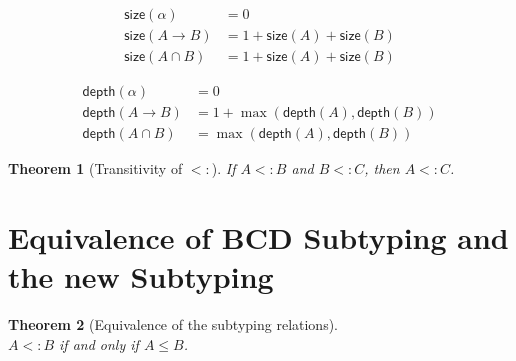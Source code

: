 \documentclass{article}
\newtheorem{theorem}{Theorem}
\begin{document}
\begin{align*}
  \mathsf{size}(\alpha) &= 0 \\
  \mathsf{size}(A → B) &= 1 + \mathsf{size}(A) + \mathsf{size}(B) \\
  \mathsf{size}(A ∩ B) &= 1 + \mathsf{size}(A) + \mathsf{size}(B)
\end{align*}

\begin{align*}
  \mathsf{depth}(\alpha) &= 0 \\
  \mathsf{depth}(A → B) &= 1 + \max(\mathsf{depth}(A), \mathsf{depth}(B)) \\
  \mathsf{depth}(A ∩ B) &= \max(\mathsf{depth}(A), \mathsf{depth}(B))
\end{align*}

\begin{theorem}[Transitivity of $<:$]\label{lem:sub-trans}
    If $A <: B$ and $B <: C$, then $A <: C$.
\end{theorem}

\section{Equivalence of BCD Subtyping and the new Subtyping}


\begin{theorem}[Equivalence of the subtyping relations]\ \\
  $A <: B$ if and only if $A ≤ B$.
\end{theorem}

\clearpage
\pagebreak



\end{document}

